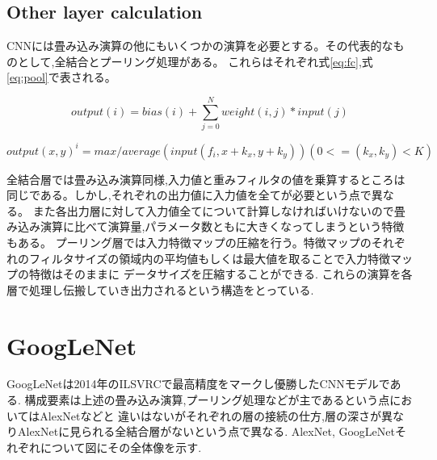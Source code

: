 {\subsection{Other layer calculation}
\label{sec:other_calc}
CNNには畳み込み演算の他にもいくつかの演算を必要とする。その代表的なものとして,全結合とプーリング処理がある。
これらはそれぞれ式\ref{eq:fc},式\ref{eq:pool}で表される。

\begin{equation}
  \label{eq:fc}
  output(i) = bias(i) + \sum_{j=0}^{N} weight(i, j) * input(j)
\end{equation}

\begin{equation}
  \label{eq:pool}
	output(x, y)^{i} = max / average(input(f_i,x + k_x, y + k_y)) (0<= (k_x, k_y) < K)
\end{equation}

全結合層では畳み込み演算同様,入力値と重みフィルタの値を乗算するところは同じである。しかし,それぞれの出力値に入力値を全てが必要という点で異なる。
また各出力層に対して入力値全てについて計算しなければいけないので畳み込み演算に比べて演算量,パラメータ数ともに大きくなってしまうという特徴もある。
プーリング層では入力特徴マップの圧縮を行う。特徴マップのそれぞれのフィルタサイズの領域内の平均値もしくは最大値を取ることで入力特徴マップの特徴はそのままに
データサイズを圧縮することができる.
これらの演算を各層で処理し伝搬していき出力されるという構造をとっている.

\section{GoogLeNet}
\label{sec:googlenet}
GoogLeNetは2014年のILSVRCで最高精度をマークし優勝したCNNモデルである.
構成要素は上述の畳み込み演算,プーリング処理などが主であるという点においてはAlexNetなどと
違いはないがそれぞれの層の接続の仕方,層の深さが異なりAlexNetに見られる全結合層がないという点で異なる.
AlexNet, GoogLeNetそれぞれについて図にその全体像を示す.


}

